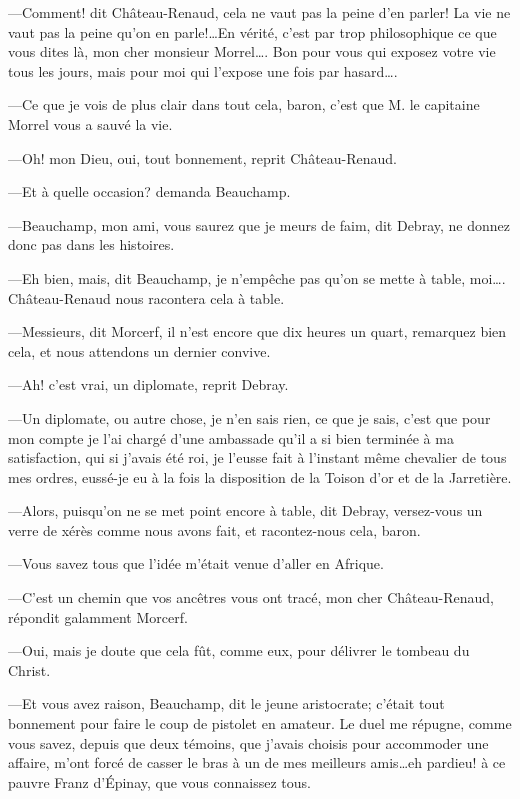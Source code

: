 —Comment! dit Château-Renaud, cela ne vaut pas la peine d'en parler! La vie ne vaut pas la peine qu'on en parle!\dots En vérité, c'est par trop philosophique ce que vous dites là, mon cher monsieur Morrel\dots. Bon pour vous qui exposez votre vie tous les jours, mais pour moi qui l'expose une fois par hasard\dots. 

—Ce que je vois de plus clair dans tout cela, baron, c'est que M. le capitaine Morrel vous a sauvé la vie. 

—Oh! mon Dieu, oui, tout bonnement, reprit Château-Renaud. 

—Et à quelle occasion? demanda Beauchamp. 

—Beauchamp, mon ami, vous saurez que je meurs de faim, dit Debray, ne donnez donc pas dans les histoires. 

—Eh bien, mais, dit Beauchamp, je n'empêche pas qu'on se mette à table, moi\dots. Château-Renaud nous racontera cela à table. 

—Messieurs, dit Morcerf, il n'est encore que dix heures un quart, remarquez bien cela, et nous attendons un dernier convive. 

—Ah! c'est vrai, un diplomate, reprit Debray. 

—Un diplomate, ou autre chose, je n'en sais rien, ce que je sais, c'est que pour mon compte je l'ai chargé d'une ambassade qu'il a si bien terminée à ma satisfaction, qui si j'avais été roi, je l'eusse fait à l'instant même chevalier de tous mes ordres, eussé-je eu à la fois la disposition de la Toison d'or et de la Jarretière. 

—Alors, puisqu'on ne se met point encore à table, dit Debray, versez-vous un verre de xérès comme nous avons fait, et racontez-nous cela, baron. 

—Vous savez tous que l'idée m'était venue d'aller en Afrique. 

—C'est un chemin que vos ancêtres vous ont tracé, mon cher Château-Renaud, répondit galamment Morcerf. 

—Oui, mais je doute que cela fût, comme eux, pour délivrer le tombeau du Christ. 

—Et vous avez raison, Beauchamp, dit le jeune aristocrate; c'était tout bonnement pour faire le coup de pistolet en amateur. Le duel me répugne, comme vous savez, depuis que deux témoins, que j'avais choisis pour accommoder une affaire, m'ont forcé de casser le bras à un de mes meilleurs amis\dots eh pardieu! à ce pauvre Franz d'Épinay, que vous connaissez tous.  

